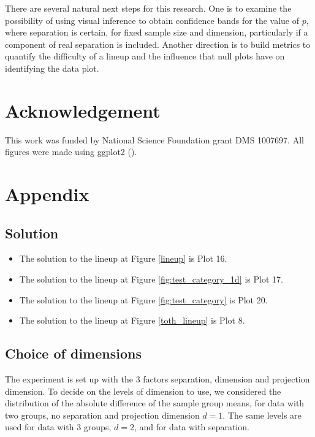There are several natural next steps for this research. One is to examine the possibility of using visual inference to obtain confidence bands for the value of $p$, where separation is certain, for fixed sample size and dimension, particularly if a component of real separation is included. Another direction is to build metrics to quantify the difficulty of a lineup and the influence that null plots have on identifying the data plot. 

\section*{Acknowledgement}
%
This work was funded by National Science Foundation grant DMS 1007697. All figures were made using ggplot2 (\cite{hadley:2009}).

%



\section*{Appendix}

\subsection*{Solution}
\begin{itemize}
\item The solution to the lineup at Figure \ref{lineup} is Plot 16. 
\item The solution to the lineup at Figure \ref{fig:test_category_1d} is Plot 17.
\item The solution to the lineup at Figure \ref{fig:test_category} is Plot 20.
\item The solution to the lineup at Figure \ref{toth_lineup} is Plot 8.

\end{itemize}

\subsection*{Choice of dimensions} \label{sec:theory}

The experiment is set up with the 3 factors separation, dimension and projection dimension. To decide on the levels of dimension to use, we considered the distribution of the absolute difference of the sample group means, for data with two groups, no separation and projection dimension $d=1$. The same levels are used for data with 3 groups, $d=2$, and for data with separation. 

